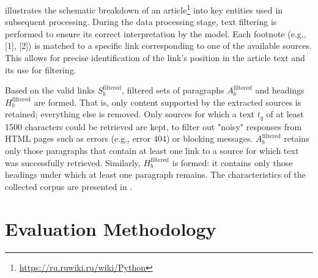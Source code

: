 \documentclass{superfri}
\begin{document}
 illustrates the schematic breakdown of an article\footnote{\url{https://ru.ruwiki.ru/wiki/Python}} into key entities used in subsequent processing.
During the data processing stage, text filtering is performed to ensure its correct interpretation by the model.
Each footnote (e.g., [1], [2]) is matched to a specific link corresponding to one of the available sources.
This allows for precise identification of the link's position in the article text and its use for filtering.


Based on the valid links \(S_b^{\mathrm{filtered}}\), filtered sets of paragraphs \(A_b^{\mathrm{filtered}}\) and headings \(H_b^{\mathrm{filtered}}\) are formed.
That is, only content supported by the extracted sources is retained; everything else is removed.
Only sources for which a text \(t_q\) of at least 1500 characters could be retrieved are kept,
to filter out "noisy" responses from HTML pages such as errors (e.g., error 404) or blocking messages.
\(A_b^{\mathrm{filtered}}\) retains only those paragraphs that contain at least one link to a source for which text was successfully retrieved.
Similarly, \(H_b^{\mathrm{filtered}}\) is formed: it contains only those headings under which at least one paragraph remains.
The characteristics of the collected corpus are presented in .

\section{Evaluation Methodology}
\end{document}
